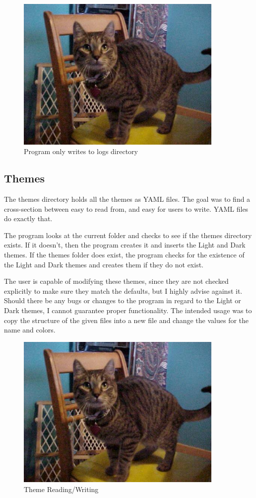 \begin{figure}[htb]
	\centering
	\includegraphics[width=10cm]{./Images/cats_00001.jpg}
	\caption{Program only writes to logs directory}
	\label{fig:DBOperations}
\end{figure}

\subsection{Themes}

The themes directory holds all the themes as YAML files. The goal was
to find a cross-section between easy to read from, and easy for users
to write. YAML files do exactly that.

The program looks at the current folder and checks to see if the
themes directory exists. If it doesn't, then the program creates it and
inserts the Light and Dark themes. If the themes folder does exist,
the program checks for the existence of the Light and Dark themes and creates
them if they do not exist.

The user is capable of modifying these themes, since they are not
checked explicitly to make sure they match the defaults, but I highly
advise against it. Should there be any bugs or changes to the
program in regard to the Light or Dark themes, I cannot guarantee proper
functionality. The intended usage was to copy the structure of the
given files into a new file and change the values for the name and colors.

\begin{figure}[htb]
	\centering
	\includegraphics[width=10cm]{./Images/cats_00001.jpg}
	\caption{Theme Reading/Writing}
	\label{fig:DBOperations}
\end{figure}

